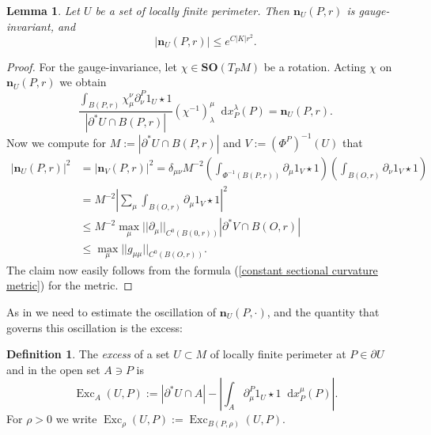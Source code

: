 \documentclass[reqno,10pt]{amsart}
\newcommand{\SpOrth}{\mathbf{SO}}
\DeclareMathOperator{\Exc}{Exc}
\newcommand*\dif{\mathop{}\!\mathrm{d}}
\newcommand{\normal}{\mathbf n}
\newcommand{\dfn}[1]{\emph{#1}\index{#1}}
\newtheorem{lemma}[theorem]{Lemma}
\theoremstyle{definition}
\newtheorem{definition}[theorem]{Definition}
\numberwithin{equation}{section}
\begin{document}
\begin{lemma}
Let $U$ be a set of locally finite perimeter. Then $\normal_U(P, r)$ is gauge-invariant, and
$$|\normal_U(P, r)| \leq e^{C|K|r^2}.$$
\end{lemma}
\begin{proof}
For the gauge-invariance, let $\chi \in \SpOrth(T_PM)$ be a rotation.
Acting $\chi$ on $\normal_U(P, r)$ we obtain
$$\frac{\int_{B(P, r)} \chi^\nu_\mu \partial^P_\nu 1_U \star 1}{|\partial^* U \cap B(P, r)|} (\chi^{-1})_\lambda^\mu \dif x^\lambda_P(P) = \normal_U(P, r).$$ 
Now we compute for $M := |\partial^* U \cap B(P, r)|$ and $V := (\Phi^P)^{-1}(U)$ that 
\begin{align*}
|\normal_U(P, r)|^2 &= |\normal_V(P, r)|^2 = \delta_{\mu\nu} M^{-2} \left(\int_{\Phi^{-1}(B(P, r))} \partial_\mu 1_V \star 1\right) \left(\int_{B(O, r)} \partial_\nu 1_V \star 1\right) \\
&= M^{-2} \left|\sum_\mu \int_{B(O, r)} \partial_\mu 1_V \star 1\right|^2 \\
&\leq M^{-2} \max_\mu ||\partial_\mu||_{C^0(B(0, r))} |\partial^* V \cap B(O, r)| \\
&\leq \max_\mu ||g_{\mu\mu}||_{C^0(B(O, r))}.
\end{align*}
The claim now easily follows from the formula (\ref{constant sectional curvature metric}) for the metric.
\end{proof}

As in \cite[Chapters 8-9]{Giusti77} we need to estimate the oscillation of $\normal_U(P, \cdot)$, and the quantity that governs this oscillation is the excess:

\begin{definition}
The \dfn{excess} of a set $U \subset M$ of locally finite perimeter at $P \in \partial U$ and in the open set $A \ni P$ is 
$$\Exc_A(U, P) := |\partial^* U \cap A| - \left|\int_A \partial^P_\mu 1_U \star 1 \dif x_P^\mu(P)\right|.$$
For $\rho > 0$ we write $\Exc_\rho(U, P) := \Exc_{B(P, \rho)}(U, P)$.
\end{definition}
\end{document}
